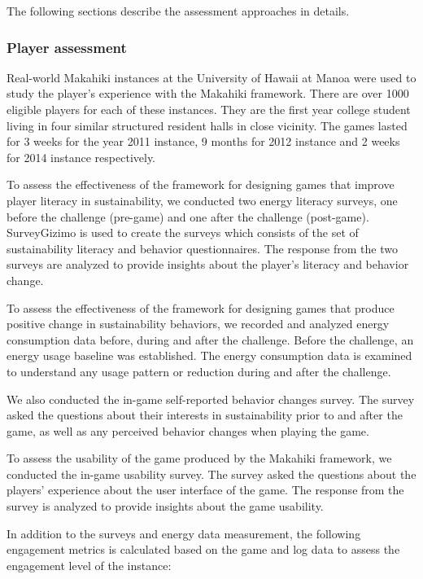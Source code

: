 The following sections describe the assessment approaches in details. 

\subsubsection{Player assessment}

Real-world Makahiki instances at the University of Hawaii at Manoa were used to study the player's experience with the Makahiki framework. There are over 1000 eligible players for each of these instances. They are the first year college student living in four similar structured resident halls in close vicinity. The games lasted for 3 weeks for the year 2011 instance, 9 months for 2012 instance and 2 weeks for 2014 instance respectively. 

To assess the effectiveness of the framework for designing games that improve player literacy in sustainability, we
conducted two energy literacy surveys, one before the challenge (pre-game) and one after
the challenge (post-game). SurveyGizimo is used to create the surveys which consists of the set of sustainability literacy and behavior questionnaires. The response from the two surveys are analyzed to provide insights about the player's literacy and behavior change.

To assess the effectiveness of the framework for designing games that produce positive change in sustainability
behaviors, we recorded and analyzed energy consumption data before, during and after the
challenge.  Before the challenge, an energy usage baseline was established. The energy consumption data is examined to understand any usage pattern or reduction during and after the challenge. 

We also conducted the in-game self-reported behavior changes survey. The survey asked the questions about their interests in sustainability prior to and after the game, as well as any perceived behavior changes when playing the game.

To assess the usability of the game produced by the Makahiki framework, we conducted the in-game usability survey. The survey asked the questions about the players' experience about the user interface of the game. The response from the survey is analyzed to provide insights about the game usability.

In addition to the surveys and energy data measurement, the following engagement metrics is calculated based on the game and log data to assess the engagement level of the instance:

